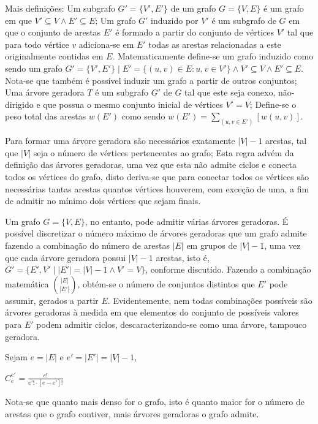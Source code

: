 \documentclass[12pt]{article}
\begin{document}
	Mais definições: Um subgrafo $G' = \{V', E'\}$ de um grafo $G = \{V, E\}$ é um grafo em que $V' \subseteq V \wedge E' \subseteq E$; Um grafo $G'$ induzido por $V'$ é um subgrafo de $G$ em que o conjunto de arestas $E'$ é formado a partir do conjunto de vértices $V'$ tal que para todo vértice $v$ adiciona-se em $E'$ todas as arestas relacionadas a este originalmente contidas em $E$. Matematicamente define-se um grafo induzido como sendo um grafo $G' = \{V', E'\} \mid E' = \{(u, v) \in E : u, v \in V'\} \wedge V' \subseteq V \wedge E' \subseteq E$. Nota-se que também é possível induzir um grafo a partir de outros conjuntos; Uma árvore geradora $T$ é um subgrafo $G'$ de $G$ tal que este seja conexo, não-dirigido e que possua o mesmo conjunto inicial de vértices $V' = V$; Define-se o peso total das arestas $w(E')$ como sendo $\displaystyle{w(E') = \sum_{(u,v \in E')}[w(u, v)]}$.

	Para formar uma árvore geradora são necessários exatamente $|V|-1$ arestas, tal que $|V|$ seja o número de vértices pertencentes ao grafo; Esta regra advém da definição das árvores geradoras, uma vez que esta não admite ciclos e conecta todos os vértices do grafo, disto deriva-se que para conectar todos os vértices são necessárias tantas arestas quantos vértices houverem, com exceção de uma, a fim de admitir no mínimo dois vértices que sejam finais.

	Um grafo $G = \{V, E\}$, no entanto, pode admitir várias árvores geradoras. É possível discretizar o número máximo de árvores geradoras que um grafo admite fazendo a combinação do número de arestas $|E|$ em grupos de $|V|-1$, uma vez que cada árvore geradora possui $|V|-1$ arestas, isto é, $G' = \{E', V' \mid |E'| = |V|-1 \wedge V' = V\}$, conforme discutido. Fazendo a combinação matemática $\displaystyle{|E| \choose |E'|}$, obtém-se o número de conjuntos distintos que $E'$ pode assumir, gerados a partir $E$. Evidentemente, nem todas combinações possíveis são árvores geradoras à medida em que elementos do conjunto de possíveis valores para $E'$ podem admitir ciclos, descaracterizando-se como uma árvore, tampouco geradora.

	Sejam $e = |E|$ e $e' = |E'| = |V|-1$,

	\begin{center}
	$\displaystyle{C_{e}^{e'}={\frac {e!}{e'! \cdot [e-e']!}}}$
	\end{center}
	
	Nota-se que quanto mais denso for o grafo, isto é quanto maior for o número de arestas que o grafo contiver, mais árvores geradoras o grafo admite.
\end{document}
